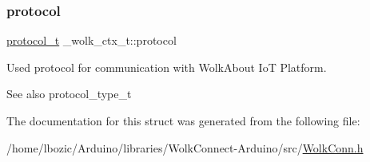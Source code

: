\subsubsection{\texorpdfstring{protocol}{protocol}}
{\footnotesize\ttfamily \hyperlink{WolkConn_8h_a91e19fa4fff461493e1a41f7c7aa4e5f}{protocol\+\_\+t} \+\_\+wolk\+\_\+ctx\+\_\+t\+::protocol}

Used protocol for communication with Wolk\+About IoT Platform. \begin{DoxySeeAlso}{See also}
protocol\+\_\+type\+\_\+t 
\end{DoxySeeAlso}


The documentation for this struct was generated from the following file\+:\begin{DoxyCompactItemize}
\item 
/home/lbozic/\+Arduino/libraries/\+Wolk\+Connect-\/\+Arduino/src/\hyperlink{WolkConn_8h}{Wolk\+Conn.\+h}\end{DoxyCompactItemize}
